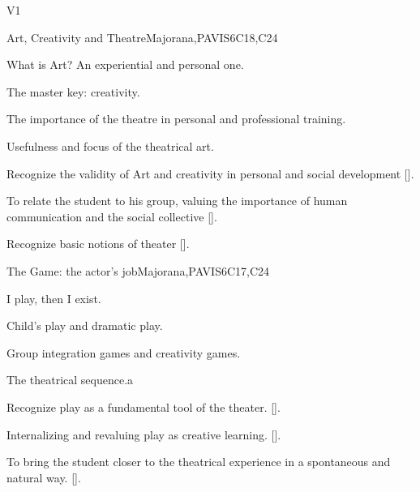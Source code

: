 \begin{syllabus}
\begin{competences}{V1}
    \item {}
    \item {}
    \item {}
\end{competences}

\begin{unit}{}{Art, Creativity and Theatre}{Majorana,PAVIS}{6}{C18,C24}
\begin{topics}
	\item What is Art? An experiential and personal one.
	\item The master key: creativity.
	\item The importance of the theatre in personal and professional training.
	\item Usefulness and focus of the theatrical art.
\end{topics}
\begin{learningoutcomes}
	\item Recognize the validity of Art and creativity in personal and social development [\Usage].
	\item To relate the student to his group, valuing the importance of human communication and the social collective [\Usage].
	\item Recognize basic notions of theater [\Usage].
\end{learningoutcomes}
\end{unit}

\begin{unit}{}{The Game: the actor's job}{Majorana,PAVIS}{6}{C17,C24}
\begin{topics}
	\item I play, then I exist.
	\item Child's play and dramatic play.
	\item Group integration games and creativity games.
	\item The theatrical sequence.a
\end{topics}
\begin{learningoutcomes}
	\item Recognize play as a fundamental tool of the theater. [\Usage].
	\item Internalizing and revaluing play as creative learning. [\Usage].
	\item To bring the student closer to the theatrical experience in a spontaneous and natural way. [\Usage].
\end{learningoutcomes}
\end{unit}


\end{syllabus}
